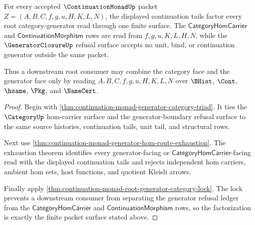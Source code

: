 \begin{theorem}
\label{thm:continuation-monad-root-category-generator-factorization}
For every accepted $\ContinuationMonadUp$ packet
$Z=(A,B,C,f,g,u,H,K,L,N)$, the displayed continuation tails factor every root
category-generator read through one finite surface. The
$\mathsf{CategoryHomCarrier}$ and $\mathsf{ContinuationMorphism}$ rows are
read from $f,g,u,K,L,H,N$, while the $\GeneratorClosureUp$ refusal surface
accepts no unit, bind, or continuation generator outside the same packet.

Thus a downstream root consumer may combine the category face and the
generator face only by reading $A,B,C,f,g,u,H,K,L,N$ over $\BHist$, $\Cont$,
$\hsame$, $\Pkg$, and $\NameCert$.
\end{theorem}
\begin{proof}
Begin with \autoref{thm:continuation-monad-generator-category-triad}. It
ties the $\CategoryUp$ hom-carrier surface and the generator-boundary refusal
surface to the same source histories, continuation tails, unit tail, and
structural rows.

Next use \autoref{thm:continuation-monad-generator-hom-route-exhaustion}. The
exhaustion theorem identifies every generator-facing or
$\mathsf{CategoryHomCarrier}$-facing read with the displayed continuation
tails and rejects independent hom carriers, ambient hom sets, host functions,
and quotient Kleisli arrows.

Finally apply \autoref{thm:continuation-monad-root-generator-category-lock}.
The lock prevents a downstream consumer from separating the generator refusal
ledger from the $\mathsf{CategoryHomCarrier}$ and
$\mathsf{ContinuationMorphism}$ rows, so the factorization is exactly the
finite packet surface stated above.
\end{proof}

